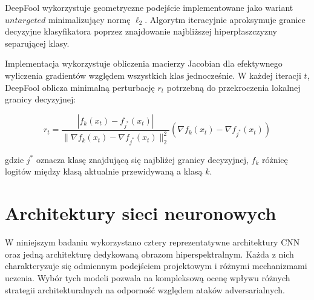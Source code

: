 \documentclass[12pt]{article}
\begin{document}
DeepFool \supercite{moosavi2016deepfool} wykorzystuje geometryczne podejście implementowane jako wariant $untargeted$ minimalizujący normę $\ell_2$. Algorytm iteracyjnie aproksymuje granice decyzyjne klasyfikatora poprzez znajdowanie najbliższej hiperpłaszczyzny separującej klasy.

Implementacja wykorzystuje obliczenia macierzy Jacobian dla efektywnego wyliczenia gradientów względem wszystkich klas jednocześnie. W każdej iteracji $t$, DeepFool oblicza minimalną perturbację $r_t$ potrzebną do przekroczenia lokalnej granicy decyzyjnej:

\begin{equation}
    r_t = \frac{|f_k(x_t) - f_{j^*}(x_t)|}{\|\nabla f_k(x_t) - \nabla f_{j^*}(x_t)\|_2^2} (\nabla f_k(x_t) - \nabla f_{j^*}(x_t))
\end{equation}

gdzie $j^*$ oznacza klasę znajdującą się najbliżej granicy decyzyjnej, $f_k$ różnicę logitów między klasą aktualnie przewidywaną a klasą $k$.

\section{Architektury sieci neuronowych}

W niniejszym badaniu wykorzystano cztery reprezentatywne architektury CNN oraz jedną architekturę dedykowaną obrazom hiperspektralnym. Każda z nich charakteryzuje się odmiennym podejściem projektowym i różnymi mechanizmami uczenia. Wybór tych modeli pozwala na kompleksową ocenę wpływu różnych strategii architekturalnych na odporność względem ataków adversarialnych.
\end{document}
